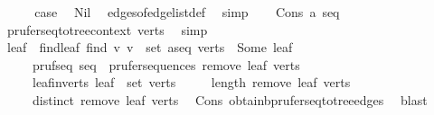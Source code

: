 \begin{isabellebody}
\ \ \isamarkupfalse%
\ \isamarkupfalse%
\ {\isacharquery}{\kern0pt}case\ \isamarkupfalse%
\ Nil\ \isamarkupfalse%
\ edges{\isacharunderscore}{\kern0pt}of{\isacharunderscore}{\kern0pt}edge{\isacharunderscore}{\kern0pt}list{\isacharunderscore}{\kern0pt}def\ \isamarkupfalse%
\ simp\isanewline
{}\isamarkupfalse%
\isanewline
\ \ \isamarkupfalse%
\ {\isacharparenleft}{\kern0pt}Cons\ a\ seq{\isacharparenright}{\kern0pt}\isanewline
\ \ \isamarkupfalse%
\ \isamarkupfalse%
\ prufer{\isacharunderscore}{\kern0pt}seq{\isacharunderscore}{\kern0pt}to{\isacharunderscore}{\kern0pt}tree{\isacharunderscore}{\kern0pt}context\ verts\ \isamarkupfalse%
\ simp\isanewline
\ \ \isamarkupfalse%
\ leaf\ \ find{\isacharunderscore}{\kern0pt}leaf{\isacharcolon}{\kern0pt}\ {\isachardoublequoteopen}find\ {\isacharparenleft}{\kern0pt}{\isasymlambda}v{\isachardot}{\kern0pt}\ v\ {\isasymnotin}\ set\ {\isacharparenleft}{\kern0pt}a{\isacharhash}{\kern0pt}seq{\isacharparenright}{\kern0pt}{\isacharparenright}{\kern0pt}\ verts\ {\isacharequal}{\kern0pt}\ Some\ leaf{\isachardoublequoteclose}\isanewline
\ \ \ \ \ pruf{\isacharunderscore}{\kern0pt}seq{\isacharprime}{\kern0pt}{\isacharcolon}{\kern0pt}\ {\isachardoublequoteopen}seq\ {\isasymin}\ prufer{\isacharunderscore}{\kern0pt}sequences\ {\isacharparenleft}{\kern0pt}remove{}\ leaf\ verts{\isacharparenright}{\kern0pt}{\isachardoublequoteclose}\isanewline
\ \ \ \ \ leaf{\isacharunderscore}{\kern0pt}in{\isacharunderscore}{\kern0pt}verts{\isacharcolon}{\kern0pt}\ {\isachardoublequoteopen}leaf\ {\isasymin}\ set\ verts{\isachardoublequoteclose}\isanewline
\ \ \ \ \ {\isachardoublequoteopen}length\ {\isacharparenleft}{\kern0pt}remove{}\ leaf\ verts{\isacharparenright}{\kern0pt}\ {\isasymge}\ {}{\isachardoublequoteclose}\isanewline
\ \ \ \ \ {\isachardoublequoteopen}distinct\ {\isacharparenleft}{\kern0pt}remove{}\ leaf\ verts{\isacharparenright}{\kern0pt}{\isachardoublequoteclose}\ \isamarkupfalse%
\ Cons\ obtain{\isacharunderscore}{\kern0pt}b{\isacharunderscore}{\kern0pt}prufer{\isacharunderscore}{\kern0pt}seq{\isacharunderscore}{\kern0pt}to{\isacharunderscore}{\kern0pt}tree{\isacharunderscore}{\kern0pt}edges\ \isamarkupfalse%
\ blast\isanewline
\ \ \isamarkupfalse%
\ \isamarkupfalse%

\end{isabellebody}
